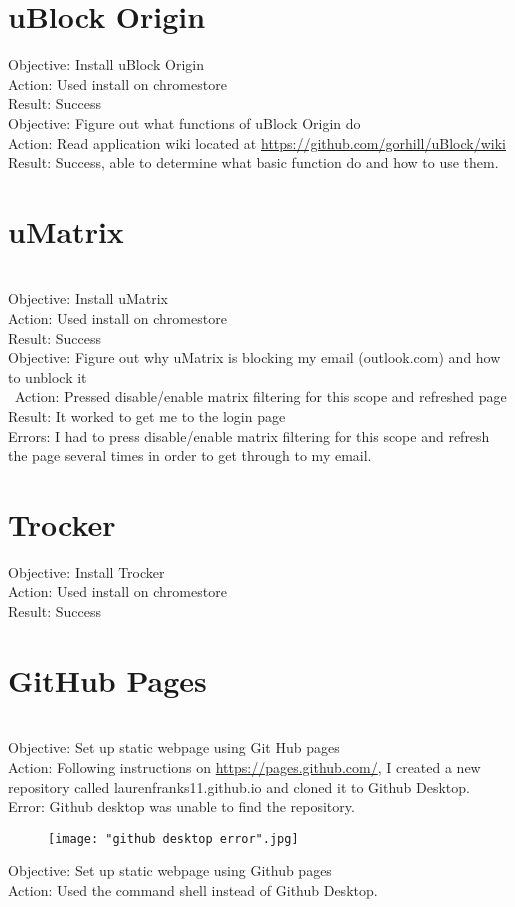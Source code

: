 \documentclass{article}
\begin{document}
\section{uBlock Origin}

Objective: Install uBlock Origin\\
Action: Used install on chromestore\\
Result: Success\\

Objective: Figure out what functions of uBlock Origin do\\
Action: Read application wiki located at \href{https://github.com/gorhill/uBlock/wiki}{https://github.com/gorhill/uBlock/wiki} 
Result: Success, able to determine what basic function do and how to use them.

\section{uMatrix}\\
Objective: Install uMatrix \\
Action: Used install on chromestore\\
Result: Success\\

Objective: Figure out why uMatrix is blocking my email (outlook.com) and how to unblock it\\\
Action: Pressed disable/enable matrix filtering for this scope and refreshed page\\
Result: It worked to get me to the login page\\
Errors: I had to press disable/enable matrix filtering for this scope and refresh the page several times in order to get through to my email. \\

\section{Trocker}
Objective: Install Trocker \\
Action: Used install on chromestore\\
Result: Success\\



\section{GitHub Pages}\\
Objective: Set up static webpage using Git Hub pages\\
Action: Following instructions on \href{https://pages.github.com/}{https://pages.github.com/}, I created a new repository called laurenfranks11.github.io and cloned it to Github Desktop.\\
Error: Github desktop was unable to find the repository.
\begin{figure}[htp]
    \centering
    \texttt{[image: "github desktop error".jpg]}
\end{figure}
\newpage
Objective: Set up static webpage using Github pages\\
Action: Used the command shell instead of Github Desktop.
\end{document}
